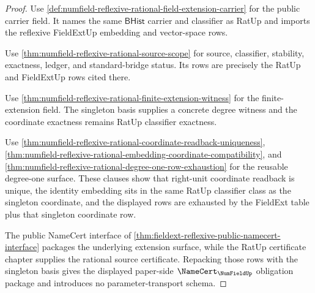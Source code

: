 \begin{proof}
Use
\autoref{def:numfield-reflexive-rational-field-extension-carrier} for the
public carrier field. It names the same $\mathsf{BHist}$ carrier and
classifier as RatUp and imports the reflexive FieldExtUp embedding and
vector-space rows.

Use \autoref{thm:numfield-reflexive-rational-source-scope} for source,
classifier, stability, exactness, ledger, and standard-bridge status. Its rows
are precisely the RatUp and FieldExtUp rows cited there.

Use
\autoref{thm:numfield-reflexive-rational-finite-extension-witness} for the
finite-extension field. The singleton basis supplies a concrete degree witness
and the coordinate exactness remains RatUp classifier exactness.

Use
\autoref{thm:numfield-reflexive-rational-coordinate-readback-uniqueness},
\autoref{thm:numfield-reflexive-rational-embedding-coordinate-compatibility},
and \autoref{thm:numfield-reflexive-rational-degree-one-row-exhaustion} for
the reusable degree-one surface. These clauses show that right-unit coordinate
readback is unique, the identity embedding sits in the same RatUp classifier
class as the singleton coordinate, and the displayed rows are exhausted by the
FieldExt table plus that singleton coordinate row.

The public NameCert interface of
\autoref{thm:fieldext-reflexive-public-namecert-interface} packages the
underlying extension surface, while the RatUp certificate chapter supplies the
rational source certificate. Repacking those rows with the singleton basis
gives the displayed paper-side $\NameCert_{\NumFieldUp}$ obligation package
and introduces no parameter-transport schema.
\end{proof}
